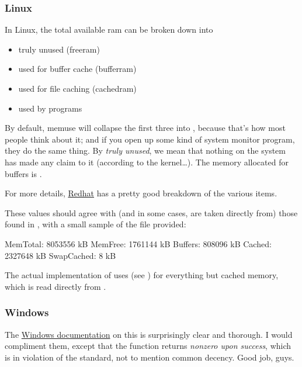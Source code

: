 \subsubsection{Linux}
In Linux, the total available ram can be broken down into
\begin{itemize}
  \item truly unused (freeram)
  \item used for buffer cache (bufferram)
  \item used for file caching (cachedram)
  \item used by programs
\end{itemize}

By default, memuse will collapse the first three into , because that's how most people think about it; and if you open up some kind of system monitor program, they do the same thing.  By \emph{truly unused}, we mean that nothing on the system has made any claim to it (according to the kernel\dots).  The memory allocated for buffers is .

For more details, \href{https://www.redhat.com/advice/tips/meminfo.html}{Redhat} has a pretty good breakdown of the various items.


These values should agree with (and in some cases, are taken directly from) those found in 
, with a small sample of the file provided:

\begin{center}
\begin{minipage}{.4\textwidth}
\begin{Output}
MemTotal:        8053556 kB
MemFree:         1761144 kB
Buffers:          808096 kB
Cached:          2327648 kB
SwapCached:            8 kB
\end{Output}
\end{minipage}
\end{center}

The actual implementation of  uses  (see ) for everything but cached memory, which is read directly from .




\subsubsection{Windows}

The \href{http://msdn.microsoft.com/en-us/library/windows/desktop/aa366589%28v=vs.85%29.aspx}{Windows documentation} 
on this is surprisingly clear and thorough.  I would compliment them, except that the function returns \emph{nonzero upon success}, which is in violation of the  standard, not to mention common decency.  Good job, guys.

